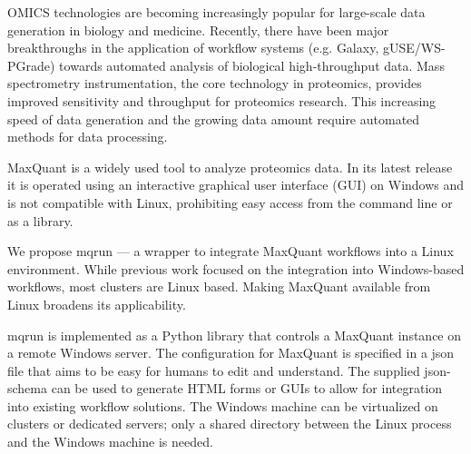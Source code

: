 OMICS technologies are becoming increasingly popular for large-scale data
generation in biology and medicine. Recently, there have been major
breakthroughs in the application of workflow systems (e.g.  Galaxy,
gUSE/WS-PGrade) towards automated analysis of biological high-throughput data.
Mass spectrometry instrumentation, the core technology in proteomics, provides
improved sensitivity and throughput for proteomics research. This increasing
speed of data generation and the growing data amount require automated methods
for data processing.

MaxQuant is a widely used tool to analyze proteomics data. In its latest
release it is operated using an interactive graphical user interface (GUI) on
Windows and is not compatible with Linux, prohibiting easy access from the
command line or as a library.

We propose mqrun — a wrapper to integrate MaxQuant workflows into a Linux
environment. While previous work focused on the integration into Windows-based
workflows, most clusters are Linux based. Making MaxQuant available from Linux
broadens its applicability.

mqrun is implemented as a Python library that controls a MaxQuant instance on
a remote Windows server. The configuration for MaxQuant is specified in a json
file that aims to be easy for humans to edit and understand. The supplied
json-schema can be used to generate HTML forms or GUIs to allow for
integration into existing workflow solutions. The Windows machine can be
virtualized on clusters or dedicated servers; only a shared directory between
the Linux process and the Windows machine is needed.
%
%
%
